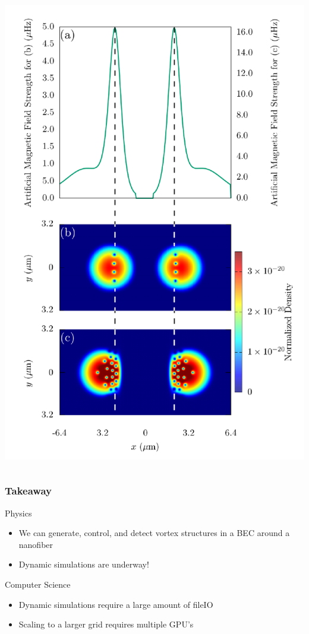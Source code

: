 \documentclass{beamer}
\begin{document}
\begin{frame}
\begin{columns}
\includegraphics[width=\linewidth]{../data/3d/vortex_line_all.pdf}
\end{columns}
\end{frame}

\begin{frame}
\frametitle{Takeaway}
Physics
\begin{itemize}
\item We can generate, control, and detect vortex structures in a BEC around a nanofiber
\item Dynamic simulations are underway!
\end{itemize}
Computer Science
\begin{itemize}
\item Dynamic simulations require a large amount of fileIO
\item Scaling to a larger grid requires multiple GPU's
\end{itemize}
\end{frame}
\end{document}

